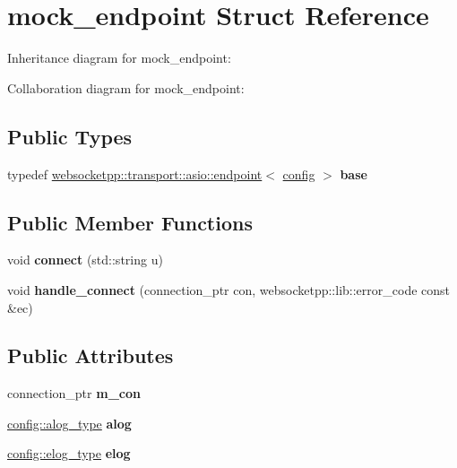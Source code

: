 \hypertarget{structmock__endpoint}{}\section{mock\+\_\+endpoint Struct Reference}
\label{structmock__endpoint}


Inheritance diagram for mock\+\_\+endpoint\+:


Collaboration diagram for mock\+\_\+endpoint\+:
\subsection*{Public Types}
\begin{DoxyCompactItemize}
\item 
\mbox{\label{structmock__endpoint_a4eebf98a5f794cd661c931b057644561}} 
typedef \mbox{\hyperlink{classwebsocketpp_1_1transport_1_1asio_1_1endpoint}{websocketpp\+::transport\+::asio\+::endpoint}}$<$ \mbox{\hyperlink{classconfig}{config}} $>$ {\bfseries base}
\end{DoxyCompactItemize}
\subsection*{Public Member Functions}
\begin{DoxyCompactItemize}
\item 
\mbox{\label{structmock__endpoint_acf190f7ee5faaae2599125bf9d8513af}} 
void {\bfseries connect} (std\+::string u)
\item 
\mbox{\label{structmock__endpoint_a64fddd1db62bfe3fb324cd223c8165cd}} 
void {\bfseries handle\+\_\+connect} (connection\+\_\+ptr con, websocketpp\+::lib\+::error\+\_\+code const \&ec)
\end{DoxyCompactItemize}
\subsection*{Public Attributes}
\begin{DoxyCompactItemize}
\item 
\mbox{\label{structmock__endpoint_a5ba0b312d46374e7fd08ccd7d7b6f822}} 
connection\+\_\+ptr {\bfseries m\+\_\+con}
\item 
\mbox{\label{structmock__endpoint_a432a9a06304d34f4164284283bbff708}} 
\mbox{\hyperlink{classwebsocketpp_1_1log_1_1stub}{config\+::alog\+\_\+type}} {\bfseries alog}
\item 
\mbox{\label{structmock__endpoint_a59b61ec062e7f2e4a75af9fa2e1d3e64}} 
\mbox{\hyperlink{classwebsocketpp_1_1log_1_1stub}{config\+::elog\+\_\+type}} {\bfseries elog}
\end{DoxyCompactItemize}
